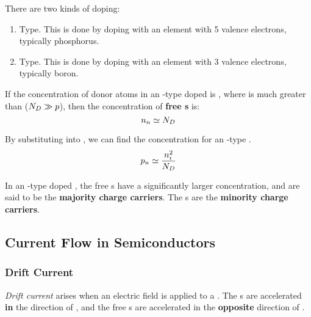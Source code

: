 There are two kinds of doping:
\begin{enumerate}[noitemsep]
\item \ElectronConcentration{} Type.
  This is done by doping with an element with 5 valence electrons, typically phosphorus.
\item \HoleConcentration{} Type.
  This is done by doping with an element with 3 valence electrons, typically boron.
\end{enumerate}

If the concentration of donor atoms in an \ElectronConcentration{}-type doped  is \DonorConcentration{}, where \DonorConcentration{} is much greater than \HoleElectronConcentration{} ($N_{D} \gg p$), then the concentration of \textbf{free s} is:
\begin{equation}\label{eq:n-Type_Donor_Concentration}
  n_{n} \simeq N_{D}
\end{equation}

By substituting  into , we can find the  concentration for an \ElectronConcentration{}-type .
\begin{equation}\label{eq:n-Type_Acceptor_Concentration}
  p_{n} \simeq \frac{n_{i}^{2}}{N_{D}}
\end{equation}

In an \NType-type doped , the free s have a significantly larger concentration, and are said to be the \textbf{majority charge carriers}.
The s are the \textbf{minority charge carriers}.


\subsection{Current Flow in Semiconductors}\label{subsec:Semiconductors_Current_Flow}
\subsubsection{Drift Current}\label{subsubsec:Drift_Current}
\begin{definition}\label{def:Drift_Current}
  \emph{Drift current} arises when an electric field \EField{} is applied to a .
  The s are accelerated \textbf{in} the direction of \EField{}, and the free s are accelerated in the \textbf{opposite} direction of \EField{}.
\end{definition}

